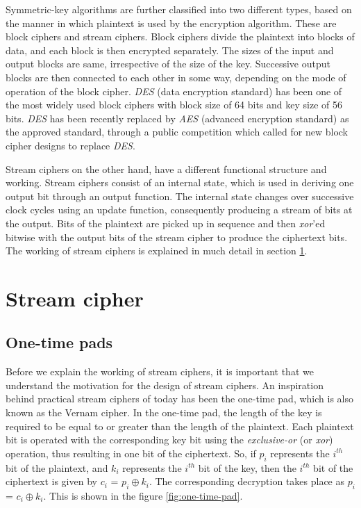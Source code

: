 Symmetric-key algorithms are further classified into two different types, based on the manner in which plaintext is used by the encryption algorithm. These are block ciphers and stream ciphers. Block ciphers divide the plaintext into blocks of data, and each block is then encrypted separately. The sizes of the input and output blocks are same, irrespective of the size of the key. Successive output blocks are then connected to each other in some way, depending on the mode of operation of the block cipher. \emph{DES} (data encryption standard) has been one of the most widely used block ciphers with block size of 64 bits and key size of 56 bits. \emph{DES} has been recently replaced by \emph{AES} (advanced encryption standard) as the approved standard, through a public competition which called for new block cipher designs to replace \emph{DES}.

Stream ciphers on the other hand, have a different functional structure and working. Stream ciphers consist of an internal state, which is used in deriving one output bit through an output function. The internal state changes over successive clock cycles using an update function, consequently producing a stream of bits at the output. Bits of the plaintext are picked up in sequence and then \emph{xor}'ed bitwise with the output bits of the stream cipher to produce the ciphertext bits. The working of stream ciphers is explained in much detail in section \ref{sec:stream-cipher}. 

\section{Stream cipher}
\label{sec:stream-cipher}

\subsection{One-time pads} 
\label{sec:one-time-pads}

Before we explain the working of stream ciphers, it is important that we understand the motivation for the design of stream ciphers. An inspiration behind practical stream ciphers of today has been the one-time pad, which is also known as the Vernam cipher. In the one-time pad, the length of the key is required to be equal to or greater than the length of the plaintext. Each plaintext bit is operated with the corresponding key bit using the \emph{exclusive-or} (or \emph{xor}) operation, thus resulting in one bit of the ciphertext. So, if $p_i$ represents the $i^{th}$ bit of the plaintext, and $k_i$ represents the $i^{th}$ bit of the key, then the $i^{th}$ bit of the ciphertext is given by $c_i$ = $p_i \oplus k_i$. The corresponding decryption takes place as $p_i$ = $c_i \oplus k_i$. This is shown in the figure \ref{fig:one-time-pad}.

